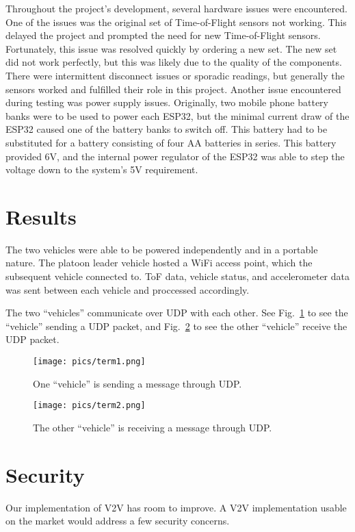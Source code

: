 \documentclass[conference]{IEEEtran}
\begin{document}
Throughout the project's development, several hardware issues were encountered.
One of the issues was the original set of Time-of-Flight sensors not working.
This delayed the project and prompted the need for new Time-of-Flight sensors.
Fortunately, this issue was resolved quickly by ordering a new set. The new set
did not work perfectly, but this was likely due to the quality of the components.
There were intermittent disconnect issues or sporadic readings, but generally
the sensors worked and fulfilled their role in this project. Another issue encountered
during testing was power supply issues. Originally, two mobile phone battery banks were
to be used to power each ESP32, but the minimal current draw of the ESP32 caused one
of the battery banks to switch off. This battery had to be substituted for a
battery consisting of four AA batteries in series. This battery provided 6V, and the
internal power regulator of the ESP32 was able to step the voltage down to the system's
5V requirement.

\section{Results}
The two vehicles were able to be powered independently and in a portable nature.
The platoon leader vehicle hosted a WiFi access point, which the subsequent vehicle
connected to. ToF data, vehicle status, and accelerometer data was sent between each
vehicle and proccessed accordingly.

The two ``vehicles'' communicate over UDP with each other. See Fig.~\ref{term1}
to see the ``vehicle'' sending a UDP packet, and Fig.~\ref{term2} to see the
other ``vehicle'' receive the UDP packet.

\begin{figure}[htbp]
\centerline{\texttt{[image: pics/term1.png]}}
\caption{One ``vehicle'' is sending a message through UDP.}
\label{term1}
\end{figure}

\begin{figure}[htbp]
\centerline{\texttt{[image: pics/term2.png]}}
\caption{The other ``vehicle'' is receiving a message through UDP.}
\label{term2}
\end{figure}

\section{Security}
Our implementation of V2V has room to improve. A V2V implementation usable on
the market would address a few security concerns.
\end{document}
